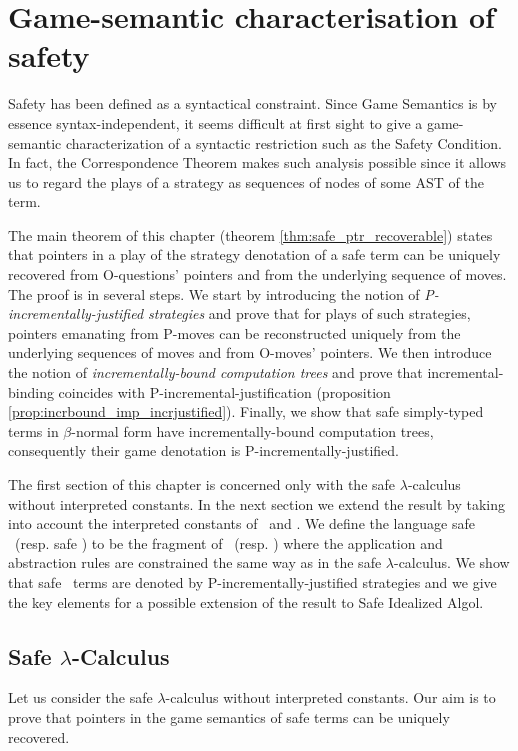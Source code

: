 \chapter{Game-semantic characterisation of safety}

Safety has been defined as a syntactical constraint. Since Game
Semantics is by essence syntax-independent, it seems difficult at
first sight to give a game-semantic characterization of a syntactic restriction such as the Safety Condition.
In fact, the Correspondence Theorem makes such analysis possible since it allows us to regard the plays of a strategy
as sequences of nodes of some AST of the term.


The main theorem of this chapter (theorem
\ref{thm:safe_ptr_recoverable}) states that pointers in a play of
the strategy denotation of a safe term can be uniquely recovered
from O-questions' pointers and from the underlying sequence of moves. The proof is in several steps. We start by introducing the notion of
\emph{P-incrementally-justified strategies} and prove that for plays
of such strategies, pointers emanating from P-moves can be reconstructed uniquely from the underlying sequences of moves and from O-moves' pointers. We then introduce the notion of \emph{incrementally-bound computation trees} and prove that incremental-binding coincides with P-incremental-justification (proposition \ref{prop:incrbound_imp_incrjustified}). Finally, we show that safe simply-typed terms in $\beta$-normal form have incrementally-bound computation trees, consequently their game denotation is P-incrementally-justified.


The first section of this chapter is concerned only with the safe $\lambda$-calculus without interpreted constants. In the next
section we extend the result by taking into account the interpreted
constants of \pcf\ and \ialgol. We define the language safe \ialgol\
(resp. safe \pcf) to be the fragment of \ialgol\ (resp. \pcf) where
the application and abstraction rules are constrained the same way
as in the safe $\lambda$-calculus. We show that safe \pcf\ terms are
denoted by P-incrementally-justified strategies and we give the key
elements for a possible extension of the result to Safe Idealized
Algol.

\section{Safe $\lambda$-Calculus}
Let us consider the safe $\lambda$-calculus without interpreted
constants. Our aim is to prove that pointers in the game semantics
of safe terms can be uniquely recovered.


